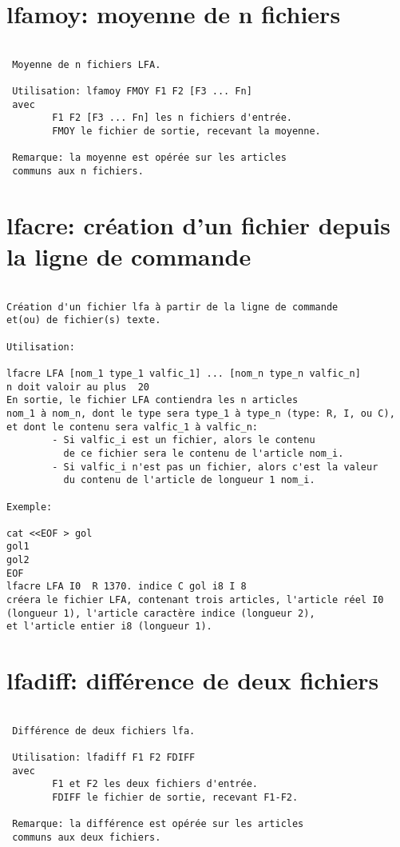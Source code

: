 \documentclass[10pt,french]{book}
\begin{document}
\section{lfamoy: moyenne de n fichiers}
\begin{verbatim}
  
 Moyenne de n fichiers LFA.
  
 Utilisation: lfamoy FMOY F1 F2 [F3 ... Fn]
 avec
        F1 F2 [F3 ... Fn] les n fichiers d'entrée.
        FMOY le fichier de sortie, recevant la moyenne.
  
 Remarque: la moyenne est opérée sur les articles
 communs aux n fichiers.
\end{verbatim}

\section{lfacre: création d'un fichier depuis la ligne de commande}
\begin{verbatim}
 
Création d'un fichier lfa à partir de la ligne de commande
et(ou) de fichier(s) texte.
 
Utilisation:
 
lfacre LFA [nom_1 type_1 valfic_1] ... [nom_n type_n valfic_n]
n doit valoir au plus  20
En sortie, le fichier LFA contiendra les n articles
nom_1 à nom_n, dont le type sera type_1 à type_n (type: R, I, ou C),
et dont le contenu sera valfic_1 à valfic_n:
        - Si valfic_i est un fichier, alors le contenu
          de ce fichier sera le contenu de l'article nom_i.
        - Si valfic_i n'est pas un fichier, alors c'est la valeur
          du contenu de l'article de longueur 1 nom_i.
 
Exemple:
 
cat <<EOF > gol
gol1
gol2
EOF
lfacre LFA I0  R 1370. indice C gol i8 I 8
créera le fichier LFA, contenant trois articles, l'article réel I0
(longueur 1), l'article caractère indice (longueur 2),
et l'article entier i8 (longueur 1).

\end{verbatim}
\section{lfadiff: différence de deux fichiers}
\begin{verbatim}
  
 Différence de deux fichiers lfa.
  
 Utilisation: lfadiff F1 F2 FDIFF
 avec
        F1 et F2 les deux fichiers d'entrée.
        FDIFF le fichier de sortie, recevant F1-F2.
  
 Remarque: la différence est opérée sur les articles
 communs aux deux fichiers.
  
\end{verbatim}
\end{document}
